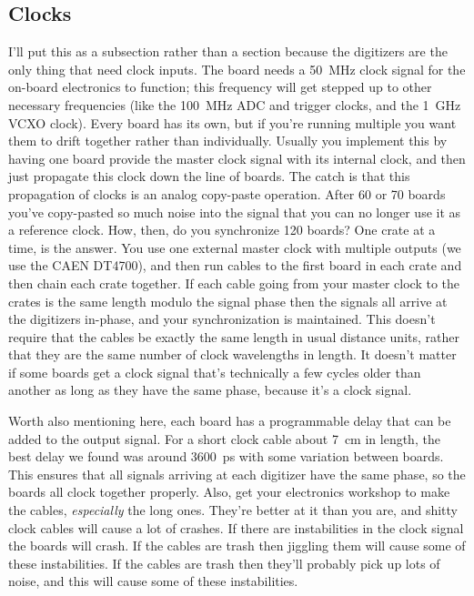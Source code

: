 \subsection{Clocks}\label{sec:digi_clocks}

I'll put this as a subsection rather than a section because the digitizers are the only thing that need clock inputs.
The board needs a \SI{50}{\mega\hertz} clock signal for the on-board electronics to function; this frequency will get stepped up to other necessary frequencies (like the \SI{100}{\mega\hertz} ADC and trigger clocks, and the \SI{1}{\giga\hertz} VCXO clock).
Every board has its own, but if you're running multiple you want them to drift together rather than individually.
Usually you implement this by having one board provide the master clock signal with its internal clock, and then just propagate this clock down the line of boards.
The catch is that this propagation of clocks is an analog copy-paste operation.
After 60 or 70 boards you've copy-pasted so much noise into the signal that you can no longer use it as a reference clock.
How, then, do you synchronize 120 boards?
One crate at a time, is the answer.
You use one external master clock with multiple outputs (we use the CAEN DT4700), and then run cables to the first board in each crate and then chain each crate together.
If each cable going from your master clock to the crates is the same length modulo the signal phase then the signals all arrive at the digitizers in-phase, and your synchronization is maintained.
This doesn't require that the cables be exactly the same length in usual distance units, rather that they are the same number of clock wavelengths in length.
It doesn't matter if some boards get a clock signal that's technically a few cycles older than another as long as they have the same phase, because it's a clock signal.

Worth also mentioning here, each board has a programmable delay that can be added to the output signal.
For a short clock cable about \SI{7}{\centi\meter} in length, the best delay we found was around \SI{3600}{\pico\second} with some variation between boards.
This ensures that all signals arriving at each digitizer have the same phase, so the boards all clock together properly.
Also, get your electronics workshop to make the cables, \emph{especially} the long ones.
They're better at it than you are, and shitty clock cables will cause a lot of crashes.
If there are instabilities in the clock signal the boards will crash.
If the cables are trash then jiggling them will cause some of these instabilities.
If the cables are trash then they'll probably pick up lots of noise, and this will cause some of these instabilities.

